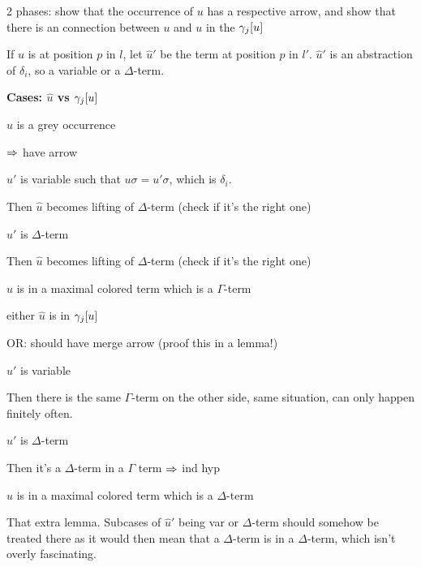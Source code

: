 \documentclass[,%
	paper=a4,%
	DIV14, %
	twoside=false,%
	liststotoc,
	bibtotoc,
	draft=false,%
	numbers=noendperiod
]{scrartcl}
\begin{document}
	2 phases: show that the occurrence of $u$ has a respective arrow, and show that there is an connection between $u$ and $u$ in the $\gamma_j[u]$

	If $\hat u$ is at position $p$ in $l$, let $\hat u'$ be the term at position $p$ in $l'$. $\hat u'$ is an abstraction of $\delta_i$, so a variable or a $\Delta$-term.

	\textbf{Cases: $\hat u$ vs $\gamma_j[u]$}
	\begin{compactitem}
	\item $\hat u$ is a grey occurrence 

		$\Rightarrow$ have arrow

		\begin{compactitem}
		\item $\hat u'$ is variable such that $u\sigma = u'\sigma$, which is $\delta_i$.

			Then $\hat u$ becomes lifting of $\Delta$-term (check if it's the right one)
		\item $\hat u'$ is $\Delta$-term

			Then $\hat u$ becomes lifting of $\Delta$-term (check if it's the right one)
		\end{compactitem}

	\item $\hat u$ is in a maximal colored term which is a $\Gamma$-term

		either $\hat u$ is in $\gamma_j[u]$ \checkmark

		OR: should have merge arrow (proof this in a lemma!)

		\begin{compactitem}
		\item $\hat u'$ is variable 

			Then there is the same $\Gamma$-term on the other side, same situation, can only happen finitely often.

		\item $\hat u'$ is $\Delta$-term

			Then it's a $\Delta$-term in a $\Gamma$ term $\Rightarrow$ ind hyp
		\end{compactitem}
	\item $\hat u$ is in a maximal colored term which is a $\Delta$-term

		That extra lemma. Subcases of $\hat u'$ being var or $\Delta$-term should somehow be treated there as it would then mean that a $\Delta$-term is in a $\Delta$-term, which isn't overly fascinating.
	\end{compactitem}
\end{document}
